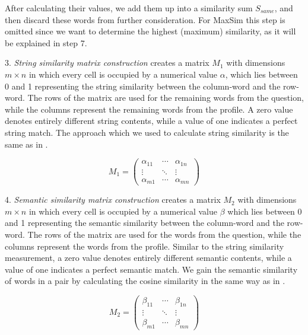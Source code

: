 \documentclass[conference]{IEEEtran}
\begin{document}
After calculating their values, we add them up into a similarity sum $S_{same}$, and then discard these words from further consideration. For MaxSim this step is omitted since we want to determine the highest (maximum) similarity, as it will be explained in step 7.

3. {\it String similarity matrix construction} creates a matrix $M_1$ with dimensions $m\times n$ in which every cell is occupied by a numerical value $\alpha$, which lies between 0 and 1 representing the string similarity between the column-word and the row-word. The rows of the matrix are used for the remaining words from the question, while the columns represent the remaining words from the profile. A zero value denotes entirely different string contents, while a value of one indicates a perfect string match. The approach which we used to calculate string similarity is the same as in \cite{bib:LinSTSS}.

\begin{equation}
	\label{eq:m1}
	M_1 = 
\left( 
	\begin{array}{ccc}
		\alpha_{11} & \cdots & \alpha_{1n} \\
		\vdots & \ddots & \vdots \\
		\alpha_{m1} & \cdots & \alpha_{mn} 
	\end{array} 
\right)
\end{equation}

4. {\it Semantic similarity matrix construction} creates a matrix $M_2$ with dimensions $m\times n$ in which every cell is occupied by a numerical value $\beta$ which lies between 0 and 1 representing the semantic similarity between the column-word and the row-word. The rows of the matrix are used for the words from the question, while the columns represent the words from the profile. Similar to the string similarity measurement, a zero value denotes entirely different semantic contents, while a value of one indicates a perfect semantic match. We gain the semantic similarity of words in a pair by calculating the cosine similarity in the same way as in \cite{bib:LinSTSS}.

\begin{equation}
	\label{eq:m2}
	M_2 = 
\left( 
	\begin{array}{ccc}
		\beta_{11} & \cdots & \beta_{1n} \\
		\vdots & \ddots & \vdots \\
		\beta_{m1} & \cdots & \beta_{mn} 
	\end{array} 
\right)
\end{equation}
\end{document}
